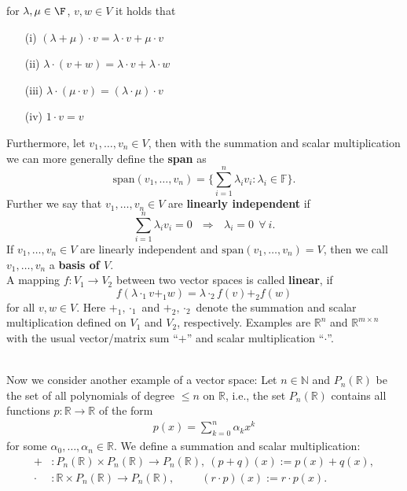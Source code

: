 {\begin{itemize}
	for $\lambda,\mu \in \F$, $v,w \in V$ it holds that  
	\begin{itemize} 
		\item[(i)] $(\lambda + \mu)\cdot v = \lambda \cdot v + \mu \cdot v$ 
		\item[(ii)] $\lambda \cdot (v+w) = \lambda \cdot v + \lambda \cdot w$ 
		\item[(iii)] $\lambda \cdot (\mu \cdot v) = (\lambda \cdot \mu) \cdot v$  
		\item[(iv)] $1 \cdot v = v$ 
	\end{itemize} 
\end{itemize}
Furthermore, let $v_1,\ldots, v_n \in V$, then with the summation and scalar multiplication we can more generally define the \textbf{span} as
$$\text{span}(v_1,\ldots, v_n)= \{\sum_{i=1}^n \lambda_i v_i: \lambda_i \in \mathbb{F}\}.$$
Further we say that $v_1,\ldots, v_n \in V$ are \textbf{linearly independent} if 
$$\sum_{i=1}^n \lambda_i v_i = 0 ~~~\Rightarrow ~~~\lambda_i = 0 ~~\forall~i. $$
If $v_1,\ldots, v_n \in V$ are linearly independent and $\text{span}(v_1,\ldots, v_n) = V$, then we call $v_1,\ldots, v_n$ a \textbf{basis of $V$}.\\
A mapping $f\colon V_1 \to V_2$ between two vector spaces is called \textbf{linear}, if $$f(\lambda \cdot_1 v +_1 w) = \lambda \cdot_2 f(v) +_2 f(w)$$
for all $v,w\in V$. Here $+_1,\cdot_1$ and $+_2,\cdot_2$ denote the summation and scalar multiplication defined on $V_1$ and $V_2$, respectively. Examples are $\mathbb{R}^n$ and $\mathbb{R}^{m\times n}$ with the usual vector/matrix sum ``$+$'' and scalar multiplication ``$\cdot$''.
}
~\\
Now we consider another example of a vector space: Let $n \in \mathbb{N}$ and $P_n(\mathbb{R})$ be the set of all polynomials of degree $\leq n$ on $\mathbb{R}$, i.e., the set $P_n(\mathbb{R})$ contains all functions $p:\mathbb{R} \rightarrow \mathbb{R}$ of the form
\begin{align*}
p(x) = \sum_{k=0}^n \alpha_k x^k
\end{align*}
for some $\alpha_0, \dots,\alpha_n \in \mathbb{R}$. We define a summation and scalar multiplication:
\begin{align*}
+&\colon P_n(\mathbb{R}) \times P_n(\mathbb{R}) \to P_n(\mathbb{R}),~(p+q)(x) := p(x) + q(x),\\
\cdot &\colon  \mathbb{R} \times P_n(\mathbb{R}) \to P_n(\mathbb{R}),\quad\quad ~~(r\cdot p)(x) := r\cdot p(x) .
\end{align*}
